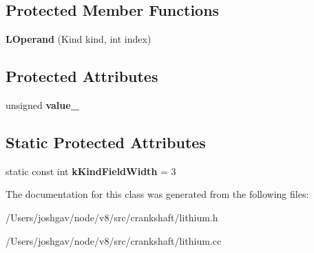 \subsection*{Protected Member Functions}
\begin{DoxyCompactItemize}
\item 
{\bfseries L\+Operand} (Kind kind, int index)\hypertarget{classv8_1_1internal_1_1_l_operand_ad9c5e7b9c36e7ad63f604d687b69cad5}{}\label{classv8_1_1internal_1_1_l_operand_ad9c5e7b9c36e7ad63f604d687b69cad5}

\end{DoxyCompactItemize}
\subsection*{Protected Attributes}
\begin{DoxyCompactItemize}
\item 
unsigned {\bfseries value\+\_\+}\hypertarget{classv8_1_1internal_1_1_l_operand_ad2c4256a03a146024e96329df5e291ef}{}\label{classv8_1_1internal_1_1_l_operand_ad2c4256a03a146024e96329df5e291ef}

\end{DoxyCompactItemize}
\subsection*{Static Protected Attributes}
\begin{DoxyCompactItemize}
\item 
static const int {\bfseries k\+Kind\+Field\+Width} = 3\hypertarget{classv8_1_1internal_1_1_l_operand_a43ed2f7086442769abca2d654c816f48}{}\label{classv8_1_1internal_1_1_l_operand_a43ed2f7086442769abca2d654c816f48}

\end{DoxyCompactItemize}


The documentation for this class was generated from the following files\+:\begin{DoxyCompactItemize}
\item 
/\+Users/joshgav/node/v8/src/crankshaft/lithium.\+h\item 
/\+Users/joshgav/node/v8/src/crankshaft/lithium.\+cc\end{DoxyCompactItemize}
